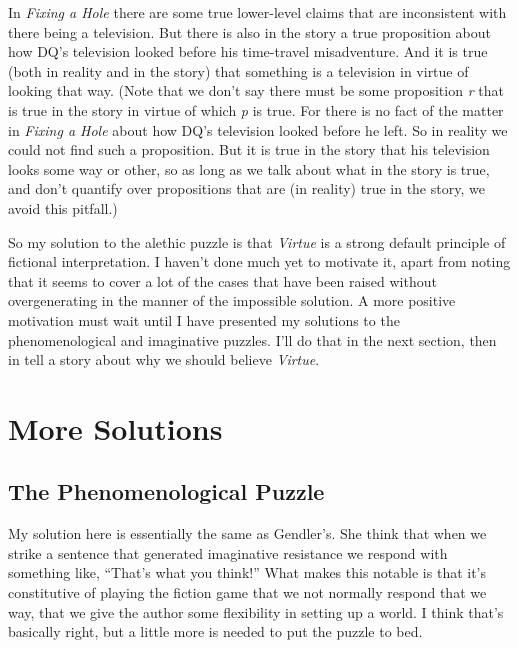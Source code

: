 \documentclass[
  11pt,
  letterpaper,
  DIV=11,
  numbers=noendperiod,
  twoside]{scrartcl}
\begin{document}
In \emph{Fixing a Hole} there are some true lower-level claims that are
inconsistent with there being a television. But there is also in the
story a true proposition about how DQ's television looked before his
time-travel misadventure. And it is true (both in reality and in the
story) that something is a television in virtue of looking that way.
(Note that we don't say there must be some proposition \emph{r} that is
true in the story in virtue of which \emph{p} is true. For there is no
fact of the matter in \emph{Fixing a Hole} about how DQ's television
looked before he left. So in reality we could not find such a
proposition. But it is true in the story that his television looks some
way or other, so as long as we talk about what in the story is true, and
don't quantify over propositions that are (in reality) true in the
story, we avoid this pitfall.)

So my solution to the alethic puzzle is that \emph{Virtue} is a strong
default principle of fictional interpretation. I haven't done much yet
to motivate it, apart from noting that it seems to cover a lot of the
cases that have been raised without overgenerating in the manner of the
impossible solution. A more positive motivation must wait until I have
presented my solutions to the phenomenological and imaginative puzzles.
I'll do that in the next section, then in tell a story about why we
should believe \emph{Virtue}.

\section{More Solutions}\label{more-solutions}

\subsection{The Phenomenological
Puzzle}\label{the-phenomenological-puzzle}

My solution here is essentially the same as Gendler's. She think that
when we strike a sentence that generated imaginative resistance we
respond with something like, ``That's what you think!'' What makes this
notable is that it's constitutive of playing the fiction game that we
not normally respond that we way, that we give the author some
flexibility in setting up a world. I think that's basically right, but a
little more is needed to put the puzzle to bed.
\end{document}
